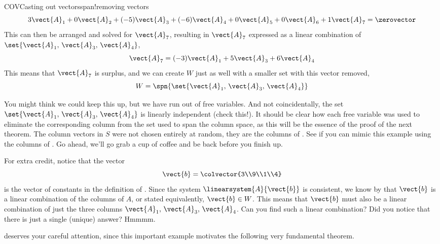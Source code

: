\begin{example}{COV}{Casting out vectors}{span!removing vectors}
%
\begin{equation*}
3\vect{A}_1+
0\vect{A}_2+
(-5)\vect{A}_3+
(-6)\vect{A}_4+
0\vect{A}_5+
0\vect{A}_6+
1\vect{A}_7
=\zerovector
\end{equation*}
%
This can then be arranged and solved for $\vect{A}_7$, resulting in $\vect{A}_7$ expressed as a linear combination of $\set{\vect{A}_1,\,\vect{A}_3,\,\vect{A}_4}$,
%
\begin{equation*}
\vect{A}_7=
(-3)\vect{A}_1+
5\vect{A}_3+
6\vect{A}_4
\end{equation*}
%
This means that $\vect{A}_7$ is surplus, and we can create $W$ just as well with a smaller set with  this vector removed,
%
\begin{equation*}
W=\spn{\set{\vect{A}_1,\,\vect{A}_3,\,\vect{A}_4}}
\end{equation*}
%
\par
%
You might think we could keep this up, but we have run out of free variables.  And not coincidentally, the set $\set{\vect{A}_1,\,\vect{A}_3,\,\vect{A}_4}$ is linearly independent (check this!).  It should be clear how each free variable was used to eliminate the corresponding column from the set used to span the column space, as this will be the essence of the proof of the next theorem.  The column vectors in $S$ were not chosen entirely at random, they are the columns of .  See if you can mimic this example using the columns of .  Go ahead, we'll go grab a cup of coffee and be back before you finish up.\par
%
For extra credit, notice that the vector
%
\begin{equation*}
\vect{b}=\colvector{3\\9\\1\\4}
\end{equation*}
%
is the vector of constants in the definition of .  Since the system $\linearsystem{A}{\vect{b}}$ is consistent, we know by  that $\vect{b}$ is a linear combination of the columns of $A$, or stated equivalently, $\vect{b}\in W$.  This means that $\vect{b}$ must also be a linear combination of just the three columns $\vect{A}_1,\,\vect{A}_3,\,\vect{A}_4$.  Can you find such a linear combination?  Did you notice that there is just a single (unique) answer?  Hmmmm.
%
\end{example}
%
%
 deserves your careful attention, since this important example motivates the following very fundamental theorem.
